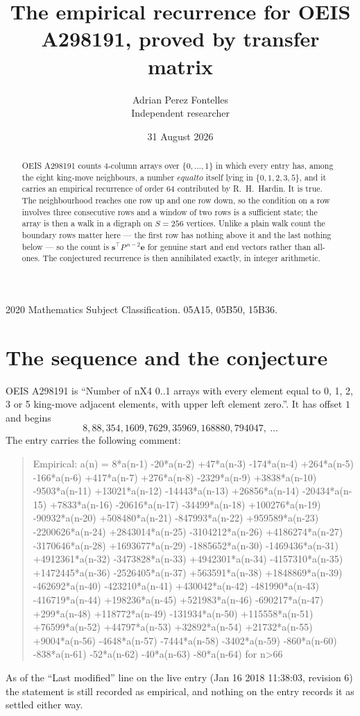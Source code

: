 \documentclass[11pt,a4paper]{article}
\title{The empirical recurrence for OEIS A298191, proved by transfer matrix}
\author{Adrian Perez Fontelles\\ \small Independent researcher}
\date{31 August 2026}
\theoremstyle{plain}
\theoremstyle{definition}
\begin{document}
\maketitle

\begin{abstract}
OEIS A298191 counts $4$-column arrays over $\{0,\dots,1\}$ in which every entry has,
among the eight king-move neighbours, a number $equal to$ itself lying in $\{0,1,2,3,5\}$, and it carries an empirical
recurrence of order $64$ contributed by R.~H.~Hardin. It is true. The neighbourhood
reaches one row up and one row down, so the condition on a row involves three consecutive
rows and a window of two rows is a sufficient state; the array is then a walk in a digraph
on $S=256$ vertices. Unlike a plain walk count the boundary rows matter here --- the first
row has nothing above it and the last nothing below --- so the count is
$\mathbf{s}^{\!\top}P^{\,n-2}\mathbf{e}$ for genuine start and end vectors rather than
all-ones. The conjectured recurrence is then annihilated exactly, in integer arithmetic.
\end{abstract}

\noindent\small 2020 Mathematics Subject Classification. 05A15, 05B50, 15B36.\normalsize

\section{The sequence and the conjecture}

OEIS A298191 is ``Number of nX4 0..1 arrays with every element equal to 0, 1, 2, 3 or 5 king-move adjacent elements, with upper left element zero.''. It has offset
$1$ and begins
\[
8, 88, 354, 1609, 7629, 35969, 168880, 794047,\ \dots
\]
The entry carries the following comment:
\begin{quote}\small
Empirical: a(n) = 8*a(n-1) -20*a(n-2) +47*a(n-3) -174*a(n-4) +264*a(n-5) -166*a(n-6) +417*a(n-7) +276*a(n-8) -2329*a(n-9) +3838*a(n-10) -9503*a(n-11) +13021*a(n-12) -14443*a(n-13) +26856*a(n-14) -20434*a(n-15) +7833*a(n-16) -20616*a(n-17) -34499*a(n-18) +100276*a(n-19) -90932*a(n-20) +508480*a(n-21) -847993*a(n-22) +959589*a(n-23) -2200626*a(n-24) +2843014*a(n-25) -3104212*a(n-26) +4186274*a(n-27) -3170646*a(n-28) +1693677*a(n-29) -1885652*a(n-30) -1469436*a(n-31) +4912361*a(n-32) -3473828*a(n-33) +4942301*a(n-34) -4157310*a(n-35) +1472445*a(n-36) -2526405*a(n-37) +563591*a(n-38) +1848869*a(n-39) -462692*a(n-40) -423210*a(n-41) +430042*a(n-42) -481990*a(n-43) -416719*a(n-44) +198236*a(n-45) +521983*a(n-46) -690217*a(n-47) +299*a(n-48) +118772*a(n-49) -131934*a(n-50) +115558*a(n-51) +76599*a(n-52) +44797*a(n-53) +32892*a(n-54) +21732*a(n-55) +9004*a(n-56) -4648*a(n-57) -7444*a(n-58) -3402*a(n-59) -860*a(n-60) -838*a(n-61) -52*a(n-62) -40*a(n-63) -80*a(n-64) for n>66
\end{quote}
As of the ``Last modified'' line on the live entry (Jan 16 2018 11:38:03, revision
6) the statement is still recorded as empirical, and nothing on the entry
records it as settled either way.
\end{document}
